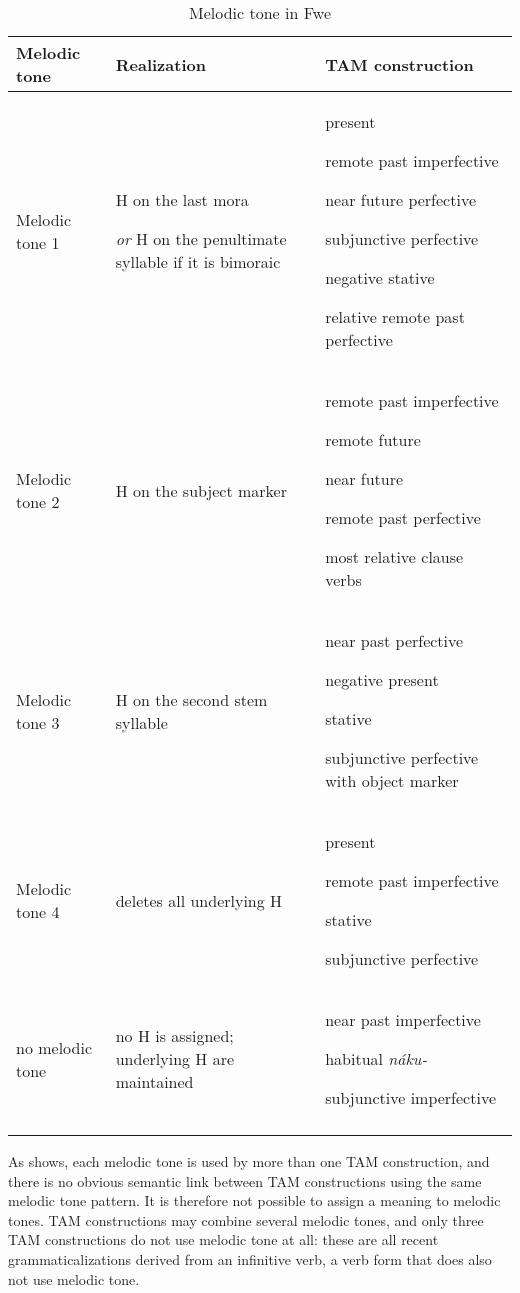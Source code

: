 \begin{table}
\label{bkm:Ref467232079}\caption{\label{tab:3:5}Melodic tone in Fwe}

\begin{tabularx}{\textwidth}{lQQ}
\lsptoprule
Melodic tone & Realization & TAM construction\\
\midrule
Melodic tone 1 & H on the last mora

\textit{or} H on the penultimate syllable if it is bimoraic & present

remote past imperfective

near future perfective

subjunctive perfective

negative stative

relative remote past perfective\\
\midrule
Melodic tone 2 & H on the subject marker & remote past imperfective

remote future

near future

remote past perfective

most relative clause verbs\\
\midrule
Melodic tone 3 & H on the second stem syllable & near past perfective

negative present

stative

subjunctive perfective with object marker\\
\midrule
Melodic tone 4 & deletes all underlying H & present

remote past imperfective

stative

subjunctive perfective\\
\midrule
no melodic tone & no H is assigned; underlying H are maintained & near past imperfective

habitual \textit{náku-}

subjunctive imperfective\\
\lspbottomrule
\end{tabularx}
\end{table}

As  shows, each melodic tone is used by more than one TAM construction, and there is no obvious semantic link between TAM constructions using the same melodic tone pattern. It is therefore not possible to assign a meaning to melodic tones. TAM constructions may combine several melodic tones, and only three TAM constructions do not use melodic tone at all: these are all recent grammaticalizations derived from an infinitive verb, a verb form that does also not use melodic tone.

